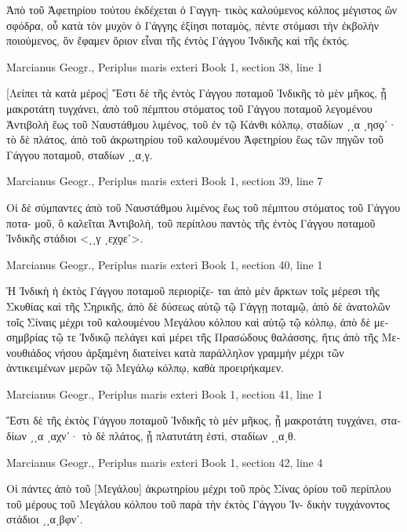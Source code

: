 \documentclass[12pt,letterpaper,twoside,final]{memoir}
\begin{document}
\begin{greek}
Ἀπὸ τοῦ Ἀφετηρίου τούτου ἐκδέχεται ὁ Γαγγη-
τικὸς καλούμενος κόλπος μέγιστος ὢν σφόδρα, οὗ κατὰ   
τὸν μυχὸν ὁ Γάγγης ἐξίησι ποταμὸς, πέντε στόμασι τὴν 
ἐκβολὴν ποιούμενος, ὃν ἔφαμεν ὅριον εἶναι τῆς ἐντὸς 
Γάγγου Ἰνδικῆς καὶ τῆς ἐκτός. 



Marcianus Geogr., Periplus maris exteri 
Book 1, section 38, line 1

[Λείπει τὰ κατὰ μέρος] 
 Ἔστι δὲ τῆς ἐντὸς Γάγγου ποταμοῦ Ἰνδικῆς τὸ 
μὲν μῆκος, ᾗ μακροτάτη τυγχάνει, ἀπὸ τοῦ πέμπτου 
στόματος τοῦ Γάγγου ποταμοῦ λεγομένου Ἀντιβολὴ 
ἕως τοῦ Ναυστάθμου λιμένος, τοῦ ἐν τῷ Κάνθι κόλπῳ, 
σταδίων ͵͵α ͵ησϙʹ· τὸ δὲ πλάτος, ἀπὸ τοῦ ἀκρωτηρίου 
τοῦ καλουμένου Ἀφετηρίου ἕως τῶν πηγῶν τοῦ Γάγγου 
ποταμοῦ, σταδίων ͵͵α͵γ. 



Marcianus Geogr., Periplus maris exteri 
Book 1, section 39, line 7

                  Οἱ δὲ σύμπαντες ἀπὸ τοῦ Ναυστάθμου 
λιμένος ἕως τοῦ πέμπτου στόματος τοῦ Γάγγου ποτα-
μοῦ, ὃ καλεῖται Ἀντιβολὴ, τοῦ περίπλου παντὸς τῆς 
ἐντὸς Γάγγου ποταμοῦ Ἰνδικῆς στάδιοι <͵͵γ ͵εχϙεʹ>. 



Marcianus Geogr., Periplus maris exteri 
Book 1, section 40, line 1

Ἡ Ἰνδικὴ ἡ ἐκτὸς Γάγγου ποταμοῦ περιορίζε-
ται ἀπὸ μὲν ἄρκτων τοῖς μέρεσι τῆς Σκυθίας καὶ τῆς 
Σηρικῆς, ἀπὸ δὲ δύσεως αὐτῷ τῷ Γάγγῃ ποταμῷ, ἀπὸ 
δὲ ἀνατολῶν τοῖς Σίναις μέχρι τοῦ καλουμένου Μεγάλου 
κόλπου καὶ αὐτῷ τῷ κόλπῳ, ἀπὸ δὲ μεσημβρίας τῷ τε 
Ἰνδικῷ πελάγει καὶ μέρει τῆς Πρασώδους θαλάσσης, 
ἥτις ἀπὸ τῆς Μενουθιάδος νήσου ἀρξαμένη διατείνει 
κατὰ παράλληλον γραμμὴν μέχρι τῶν ἀντικειμένων 
μερῶν τῷ Μεγάλῳ κόλπῳ, καθὰ προειρήκαμεν. 



Marcianus Geogr., Periplus maris exteri 
Book 1, section 41, line 1

                                
 Ἔστι δὲ τῆς ἐκτὸς Γάγγου ποταμοῦ Ἰνδικῆς 
τὸ μὲν μῆκος, ᾗ μακροτάτη τυγχάνει, σταδίων ͵͵α ͵αχνʹ· 
τὸ δὲ πλάτος, ᾗ πλατυτάτη ἐστὶ, σταδίων ͵͵α͵θ. 



Marcianus Geogr., Periplus maris exteri 
Book 1, section 42, line 4

Οἱ πάντες ἀπὸ τοῦ [Μεγάλου] ἀκρωτηρίου 
μέχρι τοῦ πρὸς Σίνας ὁρίου τοῦ περίπλου τοῦ μέρους 
τοῦ Μεγάλου κόλπου τοῦ παρὰ τὴν ἐκτὸς Γάγγου Ἰν-  
δικὴν τυγχάνοντος στάδιοι ͵͵α͵βφνʹ. 




\end{greek}
\end{document}
